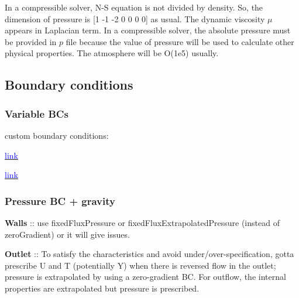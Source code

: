 \documentclass[a4paper, 12pt]{article}
\numberwithin{equation}{section}
\newcommand{\code}{\fontfamily{pcr}\selectfont}
\newcommand{\blue}[1]{\textcolor{blue}{#1}}
\begin{document}
        In a compressible solver, N-S equation is not divided by density. So, the dimension of pressure is [1 -1 -2 0 0 0 0] as usual. The dynamic viscosity $\mu$ appears in Laplacian term. In a compressible solver, the absolute pressure must be provided in $p$ file because the value of pressure will be used to calculate other physical properties. The atmosphere will be O(1e5) usually.

    \subsection{Boundary conditions}

        \subsubsection{Variable BCs}

            custom boundary conditions:

            \href{
            https://www.youtube.com/watch?v=3zcTxGHxuok
            }{\blue{link}}

            \href{
            https://www.cfd-online.com/Forums/openfoam-solving/119239-using-codedfixedvalue-apply-totalpressure-boundary-condition.html
            }{\blue{link}}

        \subsubsection{Pressure BC + gravity}

            \textbf{Walls} :: use {\code fixedFluxPressure} or {\code fixedFluxExtrapolatedPressure} (instead of {\code zeroGradient}) or it will give issues.


            \textbf{Outlet} :: To satisfy the characteristics and avoid under/over-specification, gotta prescribe U and T (potentially Y) when there is reversed flow in the outlet; pressure is extrapolated by using a zero-gradient BC. For outflow, the internal properties are extrapolated but pressure is prescribed.
\end{document}
